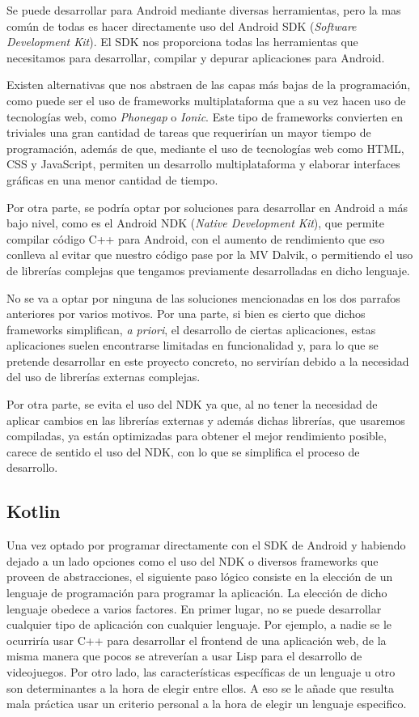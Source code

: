 Se puede desarrollar para Android mediante diversas herramientas, pero la mas común de todas es hacer directamente uso del Android SDK (\textit{Software Development Kit}). El SDK nos proporciona todas las herramientas que necesitamos para desarrollar, compilar y depurar aplicaciones para Android.

Existen alternativas que nos abstraen de las capas más bajas de la programación, como puede ser el uso de frameworks multiplataforma que a su vez hacen uso de tecnologías web, como \textit{Phonegap} o \textit{Ionic}. Este tipo de frameworks convierten en triviales una gran cantidad de tareas que requerirían un mayor tiempo de programación, además de que, mediante el uso de tecnologías web como HTML, CSS y JavaScript, permiten un desarrollo multiplataforma y elaborar interfaces gráficas en una menor cantidad de tiempo.

Por otra parte, se podría optar por soluciones para desarrollar en Android a más bajo nivel, como es el Android NDK (\textit{Native Development Kit}), que permite compilar código C++ para Android, con el aumento de rendimiento que eso conlleva al evitar que nuestro código pase por la MV Dalvik, o permitiendo el uso de librerías complejas que tengamos previamente desarrolladas en dicho lenguaje.

No se va a optar por ninguna de las soluciones mencionadas en los dos parrafos anteriores por varios motivos. Por una parte, si bien es cierto que dichos frameworks simplifican, \textit{a priori}, el desarrollo de ciertas aplicaciones, estas aplicaciones suelen encontrarse limitadas en funcionalidad y, para lo que se pretende desarrollar en este proyecto concreto, no servirían debido a la necesidad del uso de librerías externas complejas.

Por otra parte, se evita el uso del NDK ya que, al no tener la necesidad de aplicar cambios en las librerías externas y además dichas librerías, que usaremos compiladas, ya están optimizadas para obtener el mejor rendimiento posible, carece de sentido el uso del NDK, con lo que se simplifica el proceso de desarrollo.

\subsection{Kotlin}

Una vez optado por programar directamente con el SDK de Android y habiendo dejado a un lado opciones como el uso del NDK o diversos frameworks que proveen de abstracciones, el siguiente paso lógico consiste en la elección de un lenguaje de programación para programar la aplicación. La elección de dicho lenguaje obedece a varios factores. En primer lugar, no se puede desarrollar cualquier tipo de aplicación con cualquier lenguaje. Por ejemplo, a nadie se le ocurriría usar C++ para desarrollar el frontend de una aplicación web, de la misma manera que pocos se atreverían a usar Lisp para el desarrollo de videojuegos. Por otro lado, las características específicas de un lenguaje u otro son determinantes a la hora de elegir entre ellos. A eso se le añade que resulta mala práctica usar un criterio personal a la hora de elegir un lenguaje especifico.

